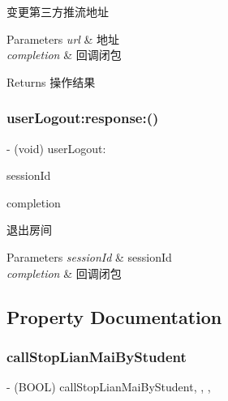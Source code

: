 变更第三方推流地址 
\begin{DoxyParams}{Parameters}
{\em url} & 地址 \\
\hline
{\em completion} & 回调闭包 \\
\hline
\end{DoxyParams}
\begin{DoxyReturn}{Returns}
操作结果 
\end{DoxyReturn}
\mbox{\label{interface_c_c_streamer_basic_a55bf0d02dbd791b32f53a0ea55680f04}} 
\subsubsection{\texorpdfstring{user\+Logout\+:response\+:()}{userLogout:response:()}}
{\footnotesize\ttfamily -\/ (void) user\+Logout\+: \begin{DoxyParamCaption}\item[{(N\+S\+String $\ast$)}]{session\+Id }\item[{response:(C\+C\+Comletion\+Block)}]{completion }\end{DoxyParamCaption}}

退出房间 
\begin{DoxyParams}{Parameters}
{\em session\+Id} & session\+Id \\
\hline
{\em completion} & 回调闭包 \\
\hline
\end{DoxyParams}


\subsection{Property Documentation}
\mbox{\label{interface_c_c_streamer_basic_aa682504571afd589ebd01253fa47f016}} 
\subsubsection{\texorpdfstring{call\+Stop\+Lian\+Mai\+By\+Student}{callStopLianMaiByStudent}}
{\footnotesize\ttfamily -\/ (B\+O\+OL) call\+Stop\+Lian\+Mai\+By\+Student\hspace{0.3cm}{\ttfamily [read]}, {\ttfamily [write]}, {\ttfamily [nonatomic]}, {\ttfamily [assign]}}

